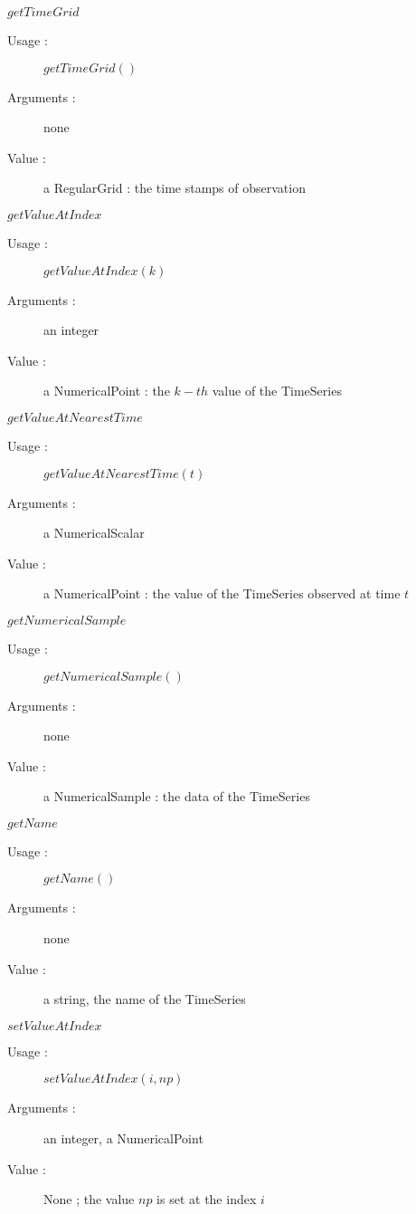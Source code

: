 \begin{description}
\begin{description}
  \item $getTimeGrid$
    \begin{description}
    \item[Usage :] $getTimeGrid()$
    \item[Arguments :] none
    \item[Value :] a RegularGrid : the time stamps of observation
    \end{description}
    \bigskip

  \item $getValueAtIndex$
    \begin{description}
    \item[Usage :] $getValueAtIndex(k)$
    \item[Arguments :] an integer
    \item[Value :] a NumericalPoint : the $k-th$ value of the TimeSeries
    \end{description}
    \bigskip

  \item $getValueAtNearestTime$
    \begin{description}
    \item[Usage :] $getValueAtNearestTime(t)$
    \item[Arguments :] a NumericalScalar
    \item[Value :] a NumericalPoint : the value of the TimeSeries observed at time $t$
    \end{description}
    \bigskip

  \item $getNumericalSample$
    \begin{description}
    \item[Usage :] $getNumericalSample()$
    \item[Arguments :] none
    \item[Value :] a NumericalSample : the data of the TimeSeries
    \end{description}
    \bigskip

  \item $getName$
    \begin{description}
    \item[Usage :] $getName()$
    \item[Arguments :] none
    \item[Value :] a string, the name of the TimeSeries
    \end{description}
    \bigskip

  \item $setValueAtIndex$
    \begin{description}
    \item[Usage :] $setValueAtIndex(i, np)$
    \item[Arguments :] an integer, a NumericalPoint
    \item[Value :] None ; the value $np$ is set at the index $i$
    \end{description}
    \bigskip


\end{description}
\end{description}
